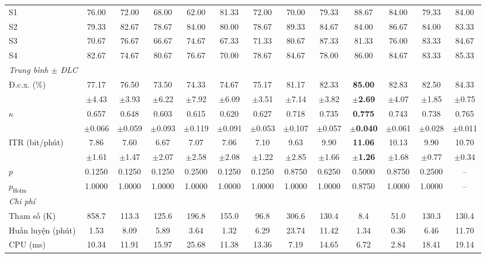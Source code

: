 \documentclass[preprint,12pt]{elsarticle}
\begin{document}
\begin{table}
\begin{adjustbox}{max width=\dimexpr\textheight+80pt\relax}
\begin{tabular}{l@{\hspace{6pt}}cccccc@{\hspace{6pt}}cc@{\hspace{6pt}}ccc@{\hspace{6pt}}c}
S1 & 76.00 & 72.00 & 68.00 & 62.00 & 81.33 & 72.00 & 70.00 & 79.33 & $\mathbf{88.67}$ & 84.00 & 79.33 & 84.00 \\
S2 & 79.33 & 82.67 & 78.67 & 84.00 & 80.00 & 78.67 & $\mathbf{89.33}$ & 84.67 & 84.00 & 86.67 & 84.00 & 83.33 \\
S3 & 70.67 & 76.67 & 66.67 & 74.67 & 67.33 & 71.33 & 80.67 & $\mathbf{87.33}$ & 81.33 & 76.00 & 83.33 & 84.67 \\
S4 & 82.67 & 74.67 & 80.67 & 76.67 & 70.00 & 78.67 & 84.67 & 78.00 & $\mathbf{86.00}$ & 84.67 & 83.33 & 85.33 \\
\midrule
\multicolumn{13}{l}{\textit{Trung bình $\pm$ ĐLC}} \\
Đ.c.x. (\%) & 77.17 & 76.50 & 73.50 & 74.33 & 74.67 & 75.17 & 81.17 & 82.33 & \textbf{85.00} & 82.83 & 82.50 & 84.33 \\
 & $\pm$4.43 & $\pm$3.93 & $\pm$6.22 & $\pm$7.92 & $\pm$6.09 & $\pm$3.51 & $\pm$7.14 & $\pm$3.82 & \textbf{$\pm$2.69} & $\pm$4.07 & $\pm$1.85 & $\pm$0.75 \\
$\kappa$ & 0.657 & 0.648 & 0.603 & 0.615 & 0.620 & 0.627 & 0.718 & 0.735 & \textbf{0.775} & 0.743 & 0.738 & 0.765 \\
 & $\pm$0.066 & $\pm$0.059 & $\pm$0.093 & $\pm$0.119 & $\pm$0.091 & $\pm$0.053 & $\pm$0.107 & $\pm$0.057 & \textbf{$\pm$0.040} & $\pm$0.061 & $\pm$0.028 & $\pm$0.011 \\
ITR (bit/phút) & 7.86 & 7.60 & 6.67 & 7.07 & 7.06 & 7.10 & 9.63 & 9.90 & \textbf{11.06} & 10.13 & 9.90 & 10.70 \\
 & $\pm$1.61 & $\pm$1.47 & $\pm$2.07 & $\pm$2.58 & $\pm$2.08 & $\pm$1.22 & $\pm$2.85 & $\pm$1.66 & \textbf{$\pm$1.26} & $\pm$1.68 & $\pm$0.77 & $\pm$0.34 \\
\midrule
$p$ & 0.1250 & 0.1250 & 0.1250 & 0.2500 & 0.1250 & 0.1250 & 0.8750 & 0.6250 & 0.5000 & 0.8750 & 0.2500 & -- \\
$p_\mathrm{Holm}$ & 1.0000 & 1.0000 & 1.0000 & 1.0000 & 1.0000 & 1.0000 & 1.0000 & 1.0000 & 0.8750 & 1.0000 & 1.0000 & -- \\
\midrule
\multicolumn{13}{l}{\textit{Chi phí}} \\
Tham số (K) & 858.7 & 113.3 & 125.6 & 196.8 & 155.0 & 96.8 & 306.6 & 130.4 & 8.4 & 51.0 & 130.3 & 130.4 \\
Huấn luyện (phút) & 1.53 & 8.09 & 5.89 & 3.64 & 1.32 & 6.29 & 23.74 & 11.42 & 1.34 & 0.36 & 6.46 & 11.70 \\
CPU (ms) & 10.34 & 11.91 & 15.97 & 25.68 & 11.38 & 13.36 & 7.19 & 14.65 & 6.72 & 2.84 & 18.41 & 19.14 \\
\bottomrule
\end{tabular}
\end{adjustbox}
\end{table}
\end{document}
